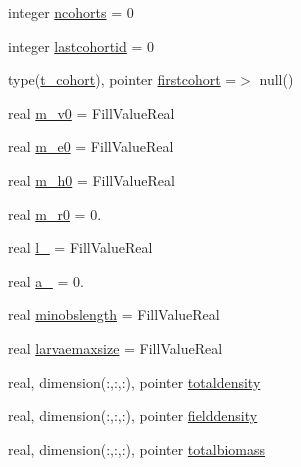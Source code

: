 \begin{DoxyCompactItemize}
\item 
integer \mbox{\hyperlink{structmodulewaterproperties_1_1t__species_a6635630a2a871c49aa42b86acec7ce0a}{ncohorts}} = 0
\item 
integer \mbox{\hyperlink{structmodulewaterproperties_1_1t__species_a65e7463fa720487c5818a457b18fb464}{lastcohortid}} = 0
\item 
type(\mbox{\hyperlink{structmodulewaterproperties_1_1t__cohort}{t\+\_\+cohort}}), pointer \mbox{\hyperlink{structmodulewaterproperties_1_1t__species_a5452b9a5c3559f1e16b45a707186ccb4}{firstcohort}} =$>$ null()
\item 
real \mbox{\hyperlink{structmodulewaterproperties_1_1t__species_a401f174de1fb8821a7d8e31715810a19}{m\+\_\+v0}} = Fill\+Value\+Real
\item 
real \mbox{\hyperlink{structmodulewaterproperties_1_1t__species_a82606e7bd78a769a33d0a98968903f4a}{m\+\_\+e0}} = Fill\+Value\+Real
\item 
real \mbox{\hyperlink{structmodulewaterproperties_1_1t__species_a755e69df70f423f4a9f55bceeac03939}{m\+\_\+h0}} = Fill\+Value\+Real
\item 
real \mbox{\hyperlink{structmodulewaterproperties_1_1t__species_a7e3ffe481a7c079994495f415dc81442}{m\+\_\+r0}} = 0.
\item 
real \mbox{\hyperlink{structmodulewaterproperties_1_1t__species_af3a9b3b063679db2517bd70192def41f}{l\+\_}} = Fill\+Value\+Real
\item 
real \mbox{\hyperlink{structmodulewaterproperties_1_1t__species_a092f4215a83e8c3a65bed83d49e9ad51}{a\+\_}} = 0.
\item 
real \mbox{\hyperlink{structmodulewaterproperties_1_1t__species_aadb1e9b319e88367ac697bed97f52d56}{minobslength}} = Fill\+Value\+Real
\item 
real \mbox{\hyperlink{structmodulewaterproperties_1_1t__species_af1be3a8cd4d6e77c21560247332c7611}{larvaemaxsize}} = Fill\+Value\+Real
\item 
real, dimension(\+:,\+:,\+:), pointer \mbox{\hyperlink{structmodulewaterproperties_1_1t__species_a8c299ef9b71aad03d39ecdac55fdcc16}{totaldensity}}
\item 
real, dimension(\+:,\+:,\+:), pointer \mbox{\hyperlink{structmodulewaterproperties_1_1t__species_a58b590f56f4f2cc150693ac8544fe193}{fielddensity}}
\item 
real, dimension(\+:,\+:,\+:), pointer \mbox{\hyperlink{structmodulewaterproperties_1_1t__species_ab202c0529b13c02a2c4ac1a3f8646a4e}{totalbiomass}}
\item 

\end{DoxyCompactItemize}

